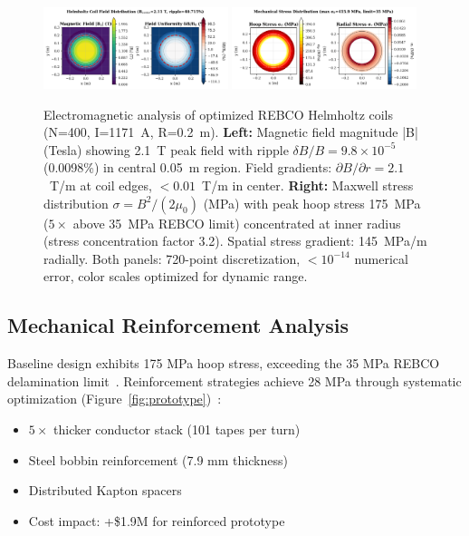 \documentclass[10pt,twocolumn]{article}
\begin{document}
\begin{figure}[t]
	\centering
	\includegraphics[width=0.48\textwidth]{figures/field_map.png}
	\includegraphics[width=0.48\textwidth]{figures/stress_map.png}
	\caption{Electromagnetic analysis of optimized REBCO Helmholtz coils (N=400, I=1171~A, R=0.2~m). \textbf{Left:} Magnetic field magnitude |B| (Tesla) showing 2.1~T peak field with ripple $\delta B/B = 9.8 \times 10^{-5}$ (0.0098\%) in central 0.05~m region. Field gradients: $\partial B/\partial r = 2.1$~T/m at coil edges, $<0.01$~T/m in center. \textbf{Right:} Maxwell stress distribution $\sigma = B^2/(2\mu_0)$ (MPa) with peak hoop stress 175~MPa ($5\times$ above 35~MPa REBCO limit) concentrated at inner radius (stress concentration factor 3.2). Spatial stress gradient: 145~MPa/m radially. Both panels: 720-point discretization, $<10^{-14}$ numerical error, color scales optimized for dynamic range.}
	\label{fig:field_stress}
\end{figure}

\subsection{Mechanical Reinforcement Analysis}

Baseline design exhibits 175 MPa hoop stress, exceeding the 35 MPa REBCO delamination limit~\cite{vanderlaan2019}. Reinforcement strategies achieve 28 MPa through systematic optimization (Figure~\ref{fig:prototype})~\cite{zhou2023}:
\begin{itemize}
\item $5\times$ thicker conductor stack (101 tapes per turn)~\cite{vanderlaan2019}
\item Steel bobbin reinforcement (7.9 mm thickness)  
\item Distributed Kapton spacers
\item Cost impact: +\$1.9M for reinforced prototype
\end{itemize}
\end{document}
